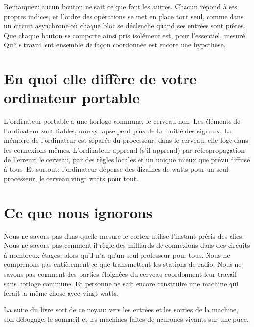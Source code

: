 Remarquez: aucun bouton ne sait ce que font les autres. Chacun répond à ses propres indices, et l'ordre des opérations se met en place tout seul, comme dans un circuit asynchrone où chaque bloc se déclenche quand ses entrées sont prêtes. Que chaque bouton se comporte ainsi pris isolément est, pour l'essentiel, mesuré. Qu'ils travaillent ensemble de façon coordonnée est encore une hypothèse.

\section*{En quoi elle diffère de votre ordinateur portable}

L'ordinateur portable a une horloge commune, le cerveau non. Les éléments de l'ordinateur sont fiables; une synapse perd plus de la moitié des signaux. La mémoire de l'ordinateur est séparée du processeur; dans le cerveau, elle loge dans les connexions mêmes. L'ordinateur apprend (s'il apprend) par rétropropagation de l'erreur; le cerveau, par des règles locales et un unique \og mieux que prévu\fg{} diffusé à tous. Et surtout: l'ordinateur dépense des dizaines de watts pour un seul processeur, le cerveau vingt watts pour tout.

\section*{Ce que nous ignorons}

Nous ne savons pas dans quelle mesure le cortex utilise l'instant précis des clics. Nous ne savons pas comment il règle des milliards de connexions dans des circuits à nombreux étages, alors qu'il n'a qu'un seul professeur pour tous. Nous ne comprenons pas entièrement ce que transmettent les stations de radio. Nous ne savons pas comment des parties éloignées du cerveau coordonnent leur travail sans horloge commune. Et personne ne sait encore construire une machine qui ferait la même chose avec vingt watts.

La suite du livre sort de ce noyau: vers les entrées et les sorties de la machine, son débogage, le sommeil et les machines faites de neurones vivants sur une puce.

